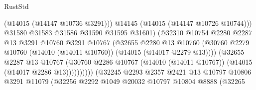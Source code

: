 \begin{lexlean}{RustStd}
\begin{coremodule}
                                              (@14015 (@14147 @10736 @3291)))
                                            @14145
                                            (@14015 (@14147 @10726 @10744)))
                                          @31580
                                          @31583
                                          @31586
                                          @31590
                                          @31595
                                          @31601)
                                        (@32310
                                          @10754
                                          @2280
                                          @2287
                                          @13
                                          @3291
                                          @10760
                                          @3291
                                          @10767
                                          (@32655
                                            @2280
                                            @13
                                            @10760
                                            (@30760
                                              @2279
                                              @10760
                                              (@14010 (@14011 @10760))
                                              (@14015 (@14017 @2279 @13))))
                                          (@32655
                                            @2287
                                            @13
                                            @10767
                                            (@30760
                                              @2286
                                              @10767
                                              (@14010 (@14011 @10767))
                                              (@14015 (@14017 @2286 @13))))))))))
                              (@32245
                                @2293
                                @2357
                                @2421
                                @13
                                @10797
                                @10806
                                @3291
                                @11079
                                (@32256
                                  @2292
                                  @1049
                                  @20032
                                  @10797
                                  @10804
                                  @8888
                                  (@32265

\end{coremodule}
\end{lexlean}
